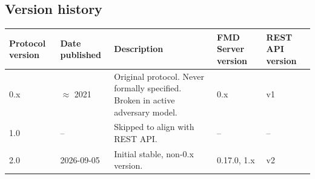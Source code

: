 \documentclass[11pt,a4paper]{article}
\begin{document}





\newpage

\appendix

\begin{landscape}

    \section{Version history}

    \begin{tabularx}{\linewidth}{l|l|X|l|l}
        Protocol version & Date published & Description & FMD Server version & REST API version \\
        \hline
        \hline
        0.x & $\approx$ 2021 & Original protocol. Never formally specified. Broken in active adversary model. & 0.x & v1 \\
        \hline
        1.0 & -- & Skipped to align with REST API. & -- & -- \\
        \hline
        2.0 & 2026-09-05 & Initial stable, non-0.x version. & 0.17.0, 1.x & v2 \\
    \end{tabularx}

\end{landscape}
\end{document}
